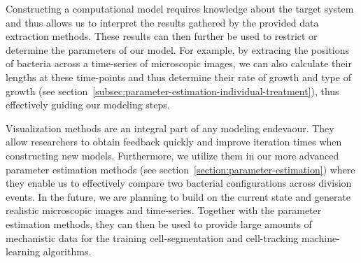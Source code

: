\documentclass{article}
\begin{document}
Constructing a computational model requires knowledge about the target system and thus allows us to
interpret the results gathered by the provided data extraction methods.
These results can then further be used to restrict or determine the parameters of our model.
For example, by extracing the positions of bacteria across a time-series of microscopic images, we
can also calculate their lengths at these time-points and thus determine their rate of growth and
type of growth (see section~\ref{subsec:parameter-estimation-individual-treatment}), thus
effectively guiding our modeling steps.

Visualization methods are an integral part of any modeling endevaour.
They allow researchers to obtain feedback quickly and improve iteration times when constructing new
models.
Furthermore, we utilize them in our more advanced parameter estimation methods (see
section~\ref{section:parameter-estimation}) where they enable us to effectively compare
two bacterial configurations across division events.
In the future, we are planning to build on the current state and generate realistic microscopic
images and time-series.
Together with the parameter estimation methods, they can then be used to provide large amounts of
mechanistic data for the training cell-segmentation and cell-tracking machine-learning algorithms.
\end{document}
